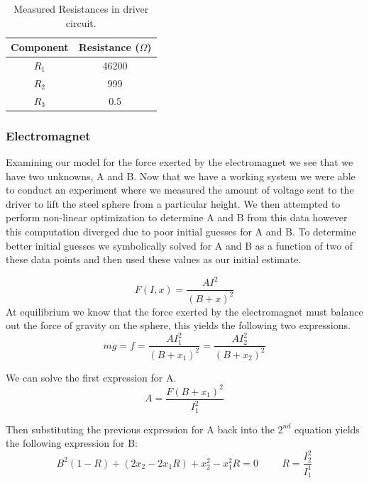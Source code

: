 \documentclass{article}
\theoremstyle{plain}
\theoremstyle{definition}
\theoremstyle{remark}
\begin{document}
\begin{table}
\begin{center}
    \begin{tabular}{|c|c|}
        \hline
        Component & Resistance ($\Omega$) \\ \hline
        $R_{1}$   & 46200                 \\ 
        $R_{2}$   & 999                   \\ 
        $R_{3}$   & 0.5                   \\
        \hline
    \end{tabular}
\caption{Measured Resistances in driver circuit.}
\label{Q1_dt1}
\end{center}
\end{table}

\subsubsection*{Electromagnet}
Examining our model for the force exerted by the electromagnet we see that we have two unknowns, A and B.  Now that we have a working system we were able to conduct an experiment where we measured the amount of voltage sent to the driver to lift the steel sphere from a particular height.  We then attempted to perform non-linear optimization to determine A and B from this data however this computation diverged due to poor initial guesses for A and B.  To determine better initial guesses we symbolically solved for A and B as a function of two of these data points and then used these values as our initial estimate.  

$$ F(I,x) = \frac{A I^2}{(B+x)^2} $$
At equilibrium we know that the force exerted by the electromagnet must balance out the force of gravity on the sphere, this yields the following two expressions.
$$ mg = f = \frac{A I_{1}^2}{(B+x_{1})^2}  = \frac{A I_{2}^2}{(B+x_{2})^2} $$ 

We can solve the first expression for A.
$$ A = \frac{F (B + x_{1})^2}{I_{1}^2}$$

Then substituting the previous expression for A back into the $2^{nd}$ equation yields the following expression for B:
$$ B^2(1-R) + (2x_2-2x_1R)+x_2^2-x_1^2R = 0 \hspace{1cm} R = \frac{I_2^2}{I_1^1} $$
\end{document}
